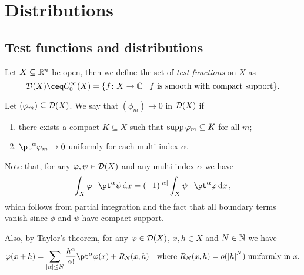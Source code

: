 \section{Distributions}
%    
%    
\subsection{Test functions and distributions}
\begin{definition}
    Let $X \subseteq \mathbb R^n$ be open, then we define the set of \emph{test functions} on $X$ as
    \[
    \Cal D(X) \ceq C^\infty_0(X) = \qty{f \colon X \to \CC \mid f \text{ is smooth with compact support}}. 
    \]
\end{definition}

\begin{definition} \label{def:test_convergence}
    Let $(\varphi_m) \subseteq \mathcal D(X)$. We say that $(\phi_m) \to 0$ in $\mathcal D(X)$ if
    \begin{enumerate}
        \item  there exists a compact $K \subseteq X$ such that $\operatorname{supp}\varphi_m \subseteq K$ for all $m$;
        \item $\pt^\alpha \phi_m \to 0$ uniformly for each multi-index $\alpha$.
    \end{enumerate}
\end{definition}

Note that, for any $\varphi, \psi \in \mathcal D(X)$ and any multi-index $\alpha$ we have
\[
\int_X \phi\cdot  \pt^\alpha \psi \dd{x} = (-1)^{\abs{\alpha}} \int_X \psi \cdot \pt^\alpha \phi \dd{x}, 
\]
which follows from partial integration and the fact that all boundary terms vanish since $\phi$ and $\psi$ have compact support. 

Also, by Taylor's theorem, for any $\varphi \in \mathcal D(X)$, $x, h \in X$ and $N \in \mathbb N$ we have
\[
\phi(x + h) = \sum_{\abs{\alpha} \leq N} \frac{h^\alpha}{\alpha!} \pt^\alpha \phi(x) + R_N(x, h) \quad\text{where } R_N(x, h) = o(\abs{h}^N) \text{ uniformly in $x$}. 
\]

